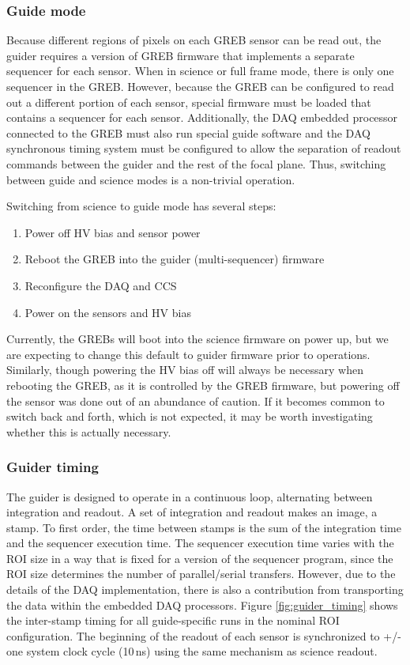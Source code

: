 \subsubsection{Guide mode}
Because different regions of pixels on each GREB sensor can be read out, the guider requires a version of GREB firmware that implements a separate sequencer for each sensor. When in science or full frame mode, there is only one sequencer in the GREB. However, because the GREB can be configured to read out a different portion of each sensor, special firmware must be loaded that contains a sequencer for each sensor. Additionally, the DAQ embedded processor connected to the GREB must also run special guide software and the DAQ synchronous timing system must be configured to allow the separation of readout commands between the guider and the rest of the focal plane. Thus, switching between guide and science modes is a non-trivial operation. 

Switching from science to guide mode has several steps:
\begin{enumerate}
    \item Power off HV bias and sensor power
    \item Reboot the GREB into the guider (multi-sequencer) firmware
    \item Reconfigure the DAQ and CCS
    \item Power on the sensors and HV bias
\end{enumerate}

Currently, the GREBs will boot into the science firmware on power up, but we are expecting to change this default to guider firmware prior to operations. Similarly, though powering the HV bias off will always be necessary when rebooting the GREB, as it is controlled by the GREB firmware, but powering off the sensor was done out of an abundance of caution. If it becomes common to switch back and forth, which is not expected, it may be worth investigating whether this is actually necessary.

\subsubsection{Guider timing}
The guider is designed to operate in a continuous loop, alternating between integration and readout. A set of integration and readout makes an image, a stamp. To first order, the time between stamps is the sum of the integration time and the sequencer execution time. The sequencer execution time varies with the ROI size in a way that is fixed for a version of the sequencer program, since the ROI size determines the number of parallel/serial transfers. However, due to the details of the DAQ implementation, there is also a contribution from transporting the data within the embedded DAQ processors. Figure \ref{fig:guider_timing} shows the inter-stamp timing for all guide-specific runs in the nominal ROI configuration. The beginning of the readout of each sensor is synchronized to +/- one system clock cycle (10\,ns) using the same mechanism as science readout. 


